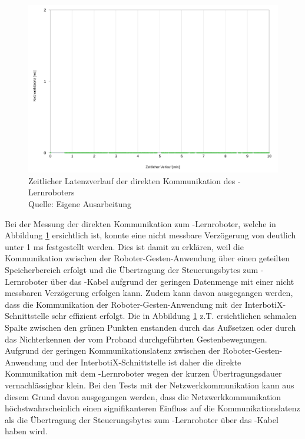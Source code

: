 \begin{figure}[htb]
	\centering
	\includegraphics[width=1.04\textwidth]{images/ergebnisse/Messung_der_direkten_Kommunikation}
	\caption[Zeitlicher Latenzverlauf der direkten Kommunikation des -Lernroboters]{Zeitlicher Latenzverlauf der direkten Kommunikation des -Lernroboters\\Quelle: Eigene Ausarbeitung}
	\label{fig:measurement_robot_direct_communication}
\end{figure}
\FloatBarrier

Bei der Messung der direkten Kommunikation zum -Lernroboter, welche in Abbildung \ref{fig:measurement_robot_direct_communication} ersichtlich ist, konnte eine nicht messbare Verzögerung von deutlich unter 1 ms festgestellt werden. Dies ist damit zu erklären, weil die Kommunikation zwischen der Roboter-Gesten-Anwendung über einen geteilten Speicherbereich erfolgt und die Übertragung der Steuerungsbytes zum -Lernroboter über das -Kabel aufgrund der geringen Datenmenge mit einer nicht messbaren Verzögerung erfolgen kann. Zudem kann davon ausgegangen werden, dass die Kommunikation der Roboter-Gesten-Anwendung mit der InterbotiX-Schnittstelle sehr effizient erfolgt. Die in Abbildung \ref{fig:measurement_robot_direct_communication} z.T. ersichtlichen schmalen Spalte zwischen den grünen Punkten enstanden durch das Außsetzen oder durch das Nichterkennen der vom Proband durchgeführten Gestenbewegungen. Aufgrund der geringen Kommunikationslatenz zwischen der Roboter-Gesten-Anwendung und der InterbotiX-Schnittstelle ist daher die direkte Kommunikation mit dem -Lernroboter wegen der kurzen Übertragungsdauer vernachlässigbar klein. Bei den Tests mit der Netzwerkkommunikation kann aus diesem Grund davon ausgegangen werden, dass die Netzwerkkommunikation höchstwahrscheinlich einen signifikanteren Einfluss auf die Kommunikationslatenz als die Übertragung der Steuerungsbytes zum -Lernroboter über das -Kabel haben wird.

